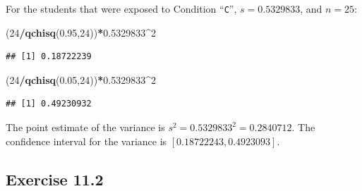 \documentclass[]{krantz}
\makeatletter
\newenvironment{Shaded}{\begin{snugshade}}{\end{snugshade}}
\newcommand{\DecValTok}[1]{\textcolor[rgb]{0.00,0.00,0.81}{#1}}
\newcommand{\FloatTok}[1]{\textcolor[rgb]{0.00,0.00,0.81}{#1}}
\newcommand{\KeywordTok}[1]{\textcolor[rgb]{0.13,0.29,0.53}{\textbf{#1}}}
\newcommand{\NormalTok}[1]{#1}
\newcommand{\OperatorTok}[1]{\textcolor[rgb]{0.81,0.36,0.00}{\textbf{#1}}}
\newenvironment{kframe}{%
\medskip{}
\setlength{\fboxsep}{.8em}
 \def\at@end@of@kframe{}%
 \ifinner\ifhmode%
  \def\at@end@of@kframe{\end{minipage}}%
  \begin{minipage}{\columnwidth}%
 \fi\fi%
 \def\FrameCommand##1{\hskip\@totalleftmargin \hskip-\fboxsep
 \colorbox{shadecolor}{##1}\hskip-\fboxsep
     \hskip-\linewidth \hskip-\@totalleftmargin \hskip\columnwidth}%
 \MakeFramed {\advance\hsize-\width
   \@totalleftmargin\z@ \linewidth\hsize
   \@setminipage}}%
 {\par\unskip\endMakeFramed%
 \at@end@of@kframe}
\renewenvironment{Shaded}{\begin{kframe}}{\end{kframe}}
\theoremstyle{definition}
\theoremstyle{definition}
\theoremstyle{definition}
\theoremstyle{remark}
\makeatother
\begin{document}
\begin{enumerate}
  For the students that were exposed to Condition ``\texttt{C}'', \(s = 0.5329833\),
  and \(n = 25\):

\begin{Shaded}
\begin{Highlighting}[]
\NormalTok{(}\DecValTok{24}\OperatorTok{/}\KeywordTok{qchisq}\NormalTok{(}\FloatTok{0.95}\NormalTok{,}\DecValTok{24}\NormalTok{))}\OperatorTok{*}\FloatTok{0.5329833}\OperatorTok{^}\DecValTok{2}
\end{Highlighting}
\end{Shaded}

\begin{verbatim}
## [1] 0.18722239
\end{verbatim}

\begin{Shaded}
\begin{Highlighting}[]
\NormalTok{(}\DecValTok{24}\OperatorTok{/}\KeywordTok{qchisq}\NormalTok{(}\FloatTok{0.05}\NormalTok{,}\DecValTok{24}\NormalTok{))}\OperatorTok{*}\FloatTok{0.5329833}\OperatorTok{^}\DecValTok{2}
\end{Highlighting}
\end{Shaded}

\begin{verbatim}
## [1] 0.49230932
\end{verbatim}

  The point estimate of the variance is \(s^2 = 0.5329833^2 = 0.2840712\).
  The confidence interval for the variance is \([0.18722243, 0.4923093]\).
\end{enumerate}

\hypertarget{exercise-11.2}{%
\subsection*{Exercise 11.2}\label{exercise-11.2}}
\end{document}
